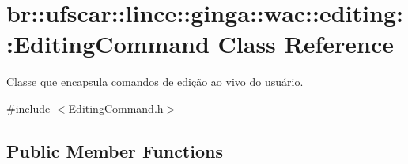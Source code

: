 \hypertarget{classbr_1_1ufscar_1_1lince_1_1ginga_1_1wac_1_1editing_1_1EditingCommand}{
\section{br::ufscar::lince::ginga::wac::editing::EditingCommand Class Reference}
\label{classbr_1_1ufscar_1_1lince_1_1ginga_1_1wac_1_1editing_1_1EditingCommand}
}


Classe que encapsula comandos de edição ao vivo do usuário.  




{\ttfamily \#include $<$EditingCommand.h$>$}

\subsection*{Public Member Functions}
